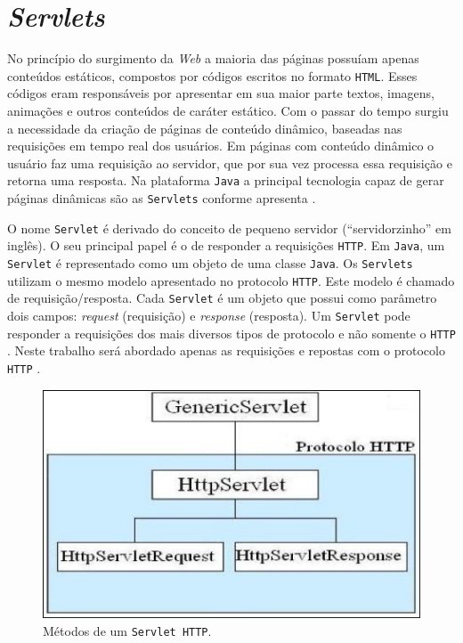 \section{\textit{Servlets}}

No princípio do surgimento da \textit{Web} a maioria das páginas possuíam apenas conteúdos estáticos, compostos por códigos escritos
no formato \texttt{HTML}. Esses códigos eram responsáveis por apresentar em sua maior parte textos, imagens, animações e outros 
conteúdos de caráter estático. Com o passar do tempo surgiu a necessidade da criação de páginas de conteúdo dinâmico, baseadas
nas requisições em tempo real dos usuários. Em páginas com conteúdo dinâmico o usuário faz uma requisição ao servidor, que 
por sua vez processa essa requisição e retorna uma resposta. Na plataforma \texttt{Java} a principal tecnologia capaz de 
gerar páginas dinâmicas são as \texttt{Servlets} conforme apresenta \cite[p.~52]{caelumweb}.

O nome \texttt{Servlet} é derivado do conceito de pequeno servidor (“servidorzinho” em inglês). O seu principal papel é o de responder
a requisições \texttt{HTTP}. Em \texttt{Java}, um \texttt{Servlet} é representado como um objeto de uma classe \texttt{Java}. Os \texttt{Servlets} utilizam o mesmo modelo 
apresentado no protocolo \texttt{HTTP}. Este modelo é chamado de requisição/resposta. Cada \texttt{Servlet} é um objeto que possui como 
parâmetro dois campos: \textit{request} (requisição) e \textit{response} (resposta). Um \texttt{Servlet} pode responder a requisições dos mais diversos 
tipos de protocolo e não somente o \texttt{HTTP} \cite[p.~53]{caelumweb}. Neste trabalho será abordado apenas as requisições e repostas 
com o protocolo \texttt{HTTP} .

\begin{figure}[h]
	\centering
	\label{fig6}
	\caption{\label{httpgetpost}Métodos de um \texttt{Servlet HTTP}.}
		\includegraphics[keepaspectratio=true,scale=1]{figuras/httpgetpost.eps}
\end{figure}

